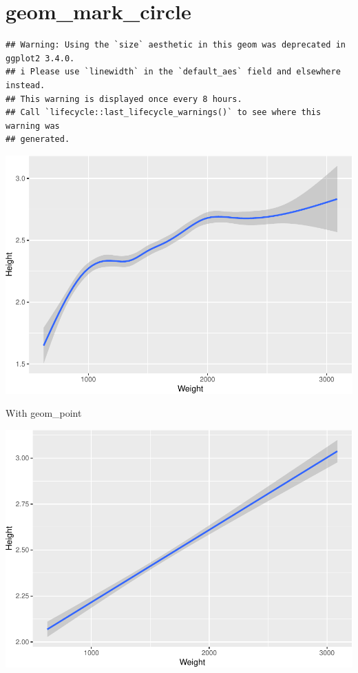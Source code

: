 \documentclass[
]{book}
\begin{document}
\hypertarget{geom_mark_circle}{%
\section{geom\_mark\_circle}\label{geom_mark_circle}}

\begin{verbatim}
## Warning: Using the `size` aesthetic in this geom was deprecated in ggplot2 3.4.0.
## i Please use `linewidth` in the `default_aes` field and elsewhere instead.
## This warning is displayed once every 8 hours.
## Call `lifecycle::last_lifecycle_warnings()` to see where this warning was
## generated.
\end{verbatim}

\includegraphics{Data-Visualisation-geom-Encyclopedia_files/figure-latex/unnamed-chunk-47-1.pdf}

With geom\_point

\includegraphics{Data-Visualisation-geom-Encyclopedia_files/figure-latex/unnamed-chunk-48-1.pdf}
\end{document}
